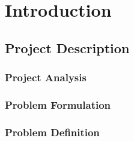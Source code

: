 \documentclass[../report.tex]{subfiles}
\begin{document}
\section{Introduction}
\label{sec:intro}

\subsection{Project Description}
\label{sec:PD}



\subsubsection{Project Analysis}
\label{subsec:PA}



\subsubsection{Problem Formulation}
\label{subsec:PF}


\subsubsection{Problem Definition}
\label{subsec:PD}
\end{document}
